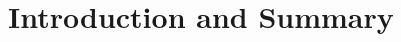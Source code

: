\begin{comment}
\documentclass[11pt]{article}  %
\usepackage{Common/toshi}

\end{comment}



\section{Introduction and Summary}\label{sec:intro}












